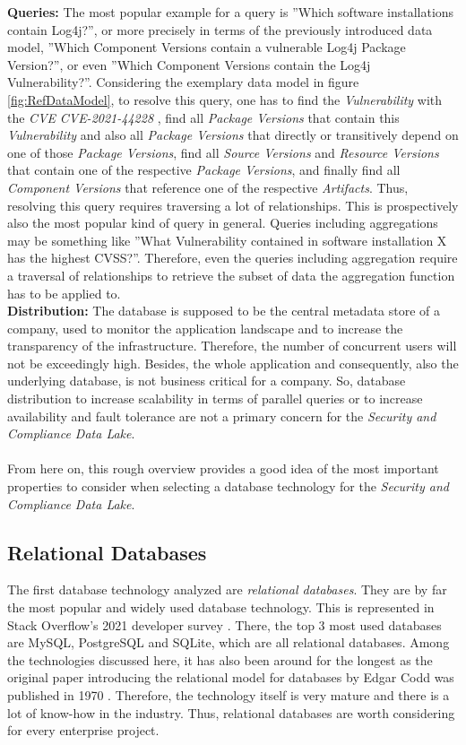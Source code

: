 \textbf{Queries:} The most popular example for a query is ''Which software installations contain Log4j?'', or more precisely in terms of the previously introduced data model, ''Which Component Versions contain a vulnerable Log4j Package Version?'', or even ''Which Component Versions contain the Log4j Vulnerability?''. Considering the exemplary data model in figure \ref{fig:RefDataModel}, to resolve this query, one has to find the \emph{Vulnerability} with the \emph{CVE} \textit{CVE-2021-44228} \cite{Log4jVuln}, find all \emph{Package Versions} that contain this \emph{Vulnerability} and also all \emph{Package Versions} that directly or transitively depend on one of those \emph{Package Versions}, find all \emph{Source Versions} and \emph{Resource Versions} that contain one of the respective \emph{Package Versions}, and finally find all \emph{Component Versions} that reference one of the respective \emph{Artifacts}. Thus, resolving this query requires traversing a lot of relationships. This is prospectively also the most popular kind of query in general. Queries including aggregations may be something like ''What Vulnerability contained in software installation X has the highest CVSS?''. Therefore, even the queries including aggregation require a traversal of relationships to retrieve the subset of data the aggregation function has to be applied to.\\
\textbf{Distribution:} The database is supposed to be the central metadata store of a company, used to monitor the application landscape and to increase the transparency of the infrastructure. Therefore, the number of concurrent users will not be exceedingly high. Besides, the whole application and consequently, also the underlying database, is not business critical for a company. So, database distribution to increase scalability in terms of parallel queries or to increase availability and fault tolerance are not a primary concern for the \emph{Security and Compliance Data Lake}.\\\\
From here on, this rough overview provides a good idea of the most important properties to consider when selecting a database technology for the \emph{Security and Compliance Data Lake}. 


\subsection{Relational Databases}
The first database technology analyzed are \textit{relational databases}. They are by far the most popular and widely used database technology. This is represented in Stack Overflow's 2021 developer survey \cite{StackoverflowDeveloperSurvey}. There, the top 3 most used databases are MySQL, PostgreSQL and SQLite, which are all relational databases. Among the technologies discussed here, it has also been around for the longest as the original paper introducing the relational model for databases by Edgar Codd was published in 1970 \cite{RelationalDatabaseOriginalPaper}. Therefore, the technology itself is very mature and there is a lot of know-how in the industry. Thus, relational databases are worth considering for every enterprise project.

